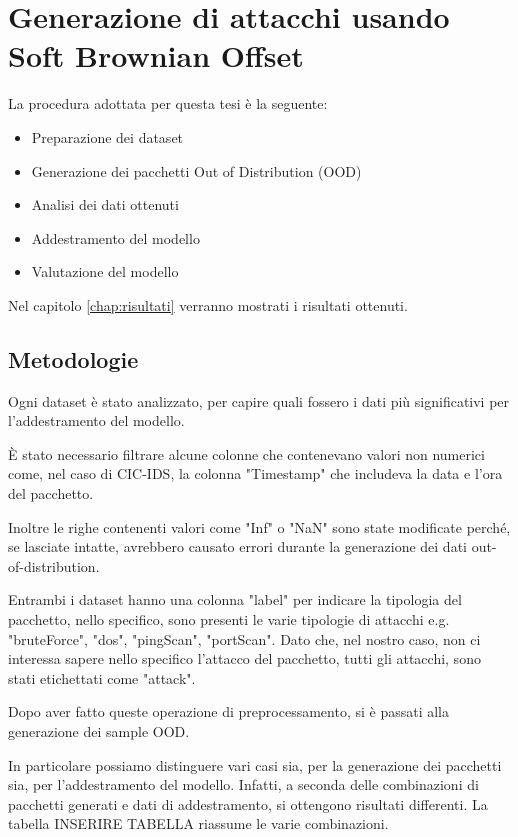 \chapter{Generazione di attacchi usando Soft Brownian Offset}
\label{chap:generazione_di_attacchi_usando_sbo}

La procedura adottata per questa tesi è la seguente:

\begin{itemize}
    \item Preparazione dei dataset
    \item Generazione dei pacchetti Out of Distribution (OOD)
    \item Analisi dei dati ottenuti
    \item Addestramento del modello
    \item Valutazione del modello
\end{itemize}



Nel capitolo \ref{chap:risultati} verranno mostrati i risultati ottenuti.


\section{Metodologie}

Ogni dataset è stato analizzato, per capire quali fossero i dati più significativi per l'addestramento del modello. 

È stato necessario filtrare alcune colonne che contenevano valori non numerici come, nel caso di CIC-IDS, la colonna "Timestamp" che includeva la data e l'ora del pacchetto. 

Inoltre le righe contenenti valori come "Inf" o "NaN" sono state modificate perché, se lasciate intatte, avrebbero causato errori durante la generazione dei dati out-of-distribution.

Entrambi i dataset hanno una colonna "label" per indicare la tipologia del pacchetto, nello specifico, sono presenti le varie tipologie di attacchi e.g. "bruteForce", "dos", "pingScan", "portScan". Dato che, nel nostro caso, non ci interessa sapere nello specifico l'attacco del pacchetto, tutti gli attacchi, sono stati etichettati come "attack".

Dopo aver fatto queste operazione di preprocessamento, si è passati alla generazione dei sample OOD.

In particolare possiamo distinguere vari casi sia, per la generazione dei pacchetti sia, per l'addestramento del modello. Infatti, a seconda delle combinazioni di pacchetti generati e dati di addestramento, si ottengono risultati differenti. La tabella INSERIRE TABELLA riassume le varie combinazioni.

